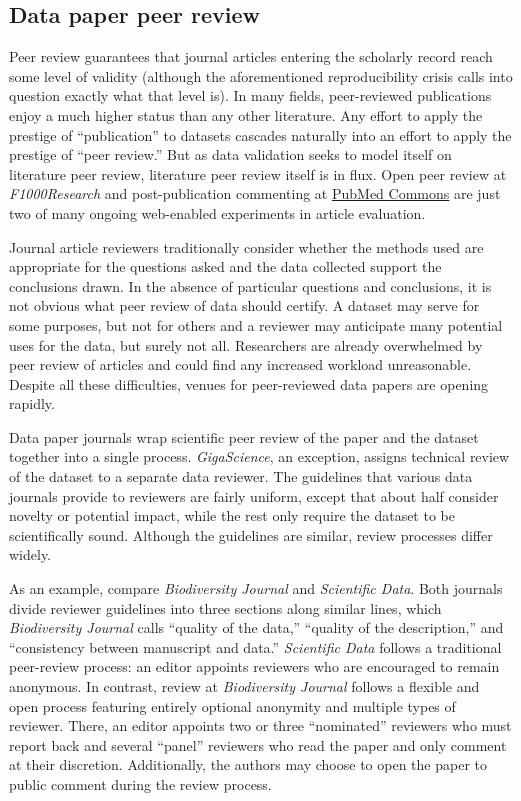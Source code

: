 \documentclass[10pt,a4paper,twocolumn]{article}
\begin{document}
{{\subsection*{Data paper peer review}\label{data-paper-peer-review}

Peer review guarantees that journal articles entering the scholarly record reach some level of validity (although the aforementioned reproducibility crisis calls into question exactly what that level is).
In many fields, peer-reviewed publications enjoy a much higher status than any other literature.
Any effort to apply the prestige of ``publication'' to datasets cascades naturally into an effort to apply the prestige of ``peer review.''
But as data validation seeks to model itself on literature peer review, literature peer review itself is in flux\cite{pulverer_transparent_2010, herron_is_2012, kriegeskorte_emerging_2012}.
Open peer review at \emph{F1000Research} and post-publication commenting at \href{http://www.ncbi.nlm.nih.gov/pubmedcommons/}{PubMed Commons} are just two of many ongoing web-enabled experiments in article evaluation.

Journal article reviewers traditionally consider whether the methods used are appropriate for the questions asked and the data collected support the conclusions drawn.
In the absence of particular questions and conclusions, it is not obvious what peer review of data should certify.
A dataset may serve for some purposes, but not for others and a reviewer may anticipate many potential uses for the data, but surely not all\cite{parsons_data_2010}.
Researchers are already overwhelmed by peer review of articles\cite{diederich_are_2013} and could find any increased workload unreasonable.
Despite all these difficulties, venues for peer-reviewed data papers are opening rapidly.

Data paper journals wrap scientific peer review of the paper and the dataset together into a single process. 
\emph{GigaScience}, an exception, assigns technical review of the dataset to a separate data reviewer.
The guidelines that various data journals provide to reviewers are fairly uniform, except that about half consider novelty or potential impact, while the rest only require the dataset to be scientifically sound.
Although the guidelines are similar, review processes differ widely. 

As an example, compare \emph{Biodiversity Journal} and \emph{Scientific Data}.
Both journals divide reviewer guidelines into three sections along similar lines, which \emph{Biodiversity Journal} calls ``quality of the data,'' ``quality of the description,'' and ``consistency between manuscript and data.''
\emph{Scientific Data} follows a traditional peer-review process: an editor appoints reviewers who are encouraged to remain anonymous.
In contrast, review at \emph{Biodiversity Journal} follows a flexible and open process featuring entirely optional anonymity and multiple types of reviewer.
There, an editor appoints two or three ``nominated'' reviewers who must report back and several ``panel'' reviewers who read the paper and only comment at their discretion.
Additionally, the authors may choose to open the paper to public comment during the review process.

}}
\end{document}
